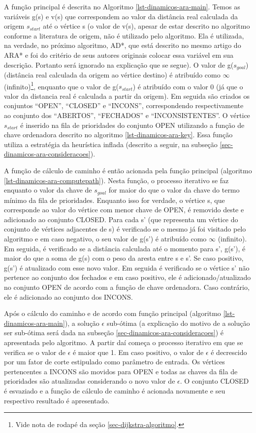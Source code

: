 A função principal é descrita no Algoritmo \ref{lst-dinamicos-ara-main}. Temos as variáveis g(s) e v(s) que correspondem ao valor da distância real calculada da origem $s_{start}$ até o vértice s (o valor de v(s), apesar de estar descrito no algoritmo conforme a literatura de origem, não é utilizado pelo algoritmo. Ela é utilizada, na verdade, no próximo algoritmo, AD*, que está descrito no mesmo artigo do ARA* e foi do critério de seus autores originais colocar essa variável em sua descrição. Portanto será ignorado na explicação que se segue). O valor de g($s_{goal}$) (distância real calculada da origem ao vértice destino) é atribuído como $\infty$ (infinito)\footnote{Vide nota de rodapé da seção \ref{sec-dijkstra-algoritmo}.}, enquanto que o valor de g($s_{start}$) é atribuído com o valor 0 (já que o valor da distancia real é calculada a partir da origem). Em seguida são criados os conjuntos ``OPEN'', ``CLOSED'' e ``INCONS'', correspondendo respectivamente ao conjunto dos ``ABERTOS'', ``FECHADOS'' e ``INCONSISTENTES''. O vértice $s_{start}$ é inserido na fila de prioridades do conjunto OPEN utilizando a função de chave ordenadora descrito no algoritmo \ref{lst-dinamicos-ara-key}. Essa função utiliza a estratégia da heurística inflada (descrito a seguir, na subseção \ref{sec-dinamicos-ara-consideracoes}).

A função de cálculo de caminho é então acionada pela função principal (algoritmo \ref{lst-dinamicos-ara-computepath}). Nesta função, o processo iterativo se faz enquanto o valor da chave de $s_{goal}$ for maior do que o valor da chave do termo mínimo da fila de prioridades. Enquanto isso for verdade, o vértice s, que corresponde ao valor do vértice com menor chave de OPEN, é removido deste e adicionado ao conjunto CLOSED. Para cada s' (que representa um vértice do conjunto de vértices adjacentes de s) é verificado se o mesmo já foi visitado pelo algoritmo e em caso negativo, o seu valor de g(s') é atribuído como $\infty$ (infinito). Em seguida, é verificado se a distância calculada até o momento para s', g(s'), é maior do que a soma de g(s) com o peso da aresta entre s e s'. Se caso positivo, g(s') é atualizado com esse novo valor. Em seguida é verificado se o vértice s' não pertence ao conjunto dos fechados e em caso positivo, ele é adicionado/atualizado no conjunto OPEN de acordo com a função de chave ordenadora. Caso contrário, ele é adicionado ao conjunto dos INCONS.

Após o cálculo do caminho e de acordo com função principal (algoritmo \ref{lst-dinamicos-ara-main}), a solução $\epsilon$ sub-ótima (a explicação do motivo de a solução ser sub-ótima será dada na subseção \ref{sec-dinamicos-ara-consideracoes}) é apresentada pelo algoritmo. A partir daí começa o processo iterativo em que se verifica se o valor de $\epsilon$ é maior que 1. Em caso positivo, o valor de $\epsilon$ é decrescido por um fator de corte estipulado como parâmetro de entrada. Os vértices pertencentes a INCONS são movidos para OPEN e todas as chaves da fila de prioridades são atualizadas considerando o novo valor de $\epsilon$. O conjunto CLOSED é esvaziado e a função de cálculo de caminho é acionada novamente e seu respectivo resultado é apresentado.

